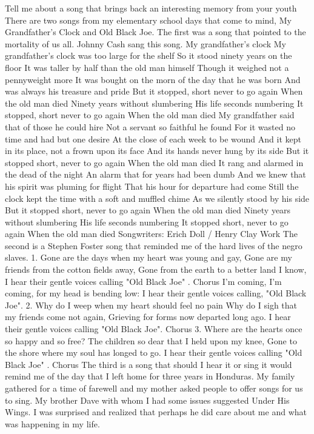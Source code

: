 Tell me about a song that brings back an interesting memory from your youth
There are two songs from my elementary school days that come to mind, My Grandfather's Clock and Old Black Joe. The first was a song that pointed to the mortality of us all. Johnny Cash sang this song.
My grandfather's clock
My grandfather's clock was too large for the shelf
So it stood ninety years on the floor
It was taller by half than the old man himself
Though it weighed not a pennyweight more
It was bought on the morn of the day that he was born
And was always his treasure and pride
But it stopped, short never to go again
When the old man died
Ninety years without slumbering
His life seconds numbering
It stopped, short never to go again
When the old man died
My grandfather said that of those he could hire
Not a servant so faithful he found
For it wasted no time and had but one desire
At the close of each week to be wound
And it kept in its place, not a frown upon its face
And its hands never hung by its side
But it stopped short, never to go again
When the old man died
It rang and alarmed in the dead of the night
An alarm that for years had been dumb
And we knew that his spirit was pluming for flight
That his hour for departure had come
Still the clock kept the time with a soft and muffled chime
As we silently stood by his side
But it stopped short, never to go again
When the old man died
Ninety years without slumbering
His life seconds numbering
It stopped short, never to go again
When the old man died
Songwriters: Erich Doll / Henry Clay Work
The second is a Stephen Foster song that reminded me of the hard lives of the negro slaves.
1. Gone are the days when my heart was young and gay, Gone are my friends from the cotton fields away, Gone from the earth to a better land I know, I hear their gentle voices calling "Old Black Joe" . 
Chorus I'm coming, I'm coming, for my head is bending low: I hear their gentle voices calling, "Old Black Joe". 
2. Why do I weep when my heart should feel no pain Why do I sigh that my friends come not again, Grieving for forms now departed long ago. I hear their gentle voices calling "Old Black Joe". Chorus 
3. Where are the hearts once so happy and so free? The children so dear that I held upon my knee, Gone to the shore where my soul has longed to go. I hear their gentle voices calling "Old Black Joe" . Chorus
The third is a song that should I hear it or sing it would remind me of the day that I left home for three years in Honduras. My family gathered for a time of farewell and my mother asked people to offer songs for us to sing. My brother Dave with whom I had some issues suggested Under His Wings. I was surprised and realized that perhaps he did care about me and what was happening in my life. 
